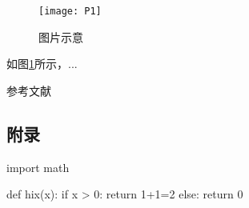 \documentclass[withoutpreface,bwprint]{cumcmthesis} %
\begin{document}
\begin{figure}[!h]
	\centering
	\texttt{[image: P1]}
	\caption{图片示意}
	\label{P1}
\end{figure}


如图\ref{P1}所示，...

\newpage
\begin{thebibliography}{9}%
	 参考文献
\end{thebibliography}



\newpage
\begin{appendices}
	

	\section{附录}

\begin{python}
import math

def hix(x):
if x > 0:
return 1+1=2
else:
return 0

\end{python}




\end{appendices}
\end{document}
